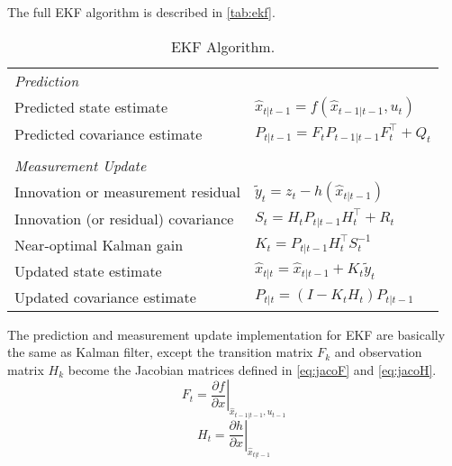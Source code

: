 The full \gls{EKF} algorithm is described in \autoref{tab:ekf}.
\begin{table}[h]
\begin{adjustbox}{max width=\textwidth}
  \centering
  \begin{tabular}{ll}
 \textit{Prediction} & \\
Predicted state estimate & $\hat{x}_{t|t-1} = f(\hat{x}_{t-1|t-1}, u_{t})$ \\
Predicted covariance estimate & $P_{t|t-1} =  {{F_{t}}} P_{t-1|t-1}{ {F_{t}^\top}} + Q_{t}$ \\
&\\
\textit{Measurement Update} & \\
Innovation or measurement residual & $\tilde{y}_{t} = z_{t} - h(\hat{x}_{t|t-1})$ \\
Innovation (or residual) covariance & $S_{t} = {{H_{t}}}P_{t|t-1}{{H_{t}^\top}} + R_{t}$ \\
Near-optimal Kalman gain & $K_{t} = P_{t|t-1}{{H_{t}^\top}}S_{t}^{-1}$ \\
Updated state estimate & $\hat{x}_{t|t} = \hat{x}_{t|t-1} + K_{t}\tilde{y}_{t}$ \\
Updated covariance estimate & $P_{t|t} = (I - K_{t} {{H_{t}}}) P_{t|t-1}$ \\
   
  \end{tabular}
  \end{adjustbox}
  \caption[Extended Kalman Filter Algorithm.]{\gls{EKF} Algorithm.}
  \label{tab:ekf}
\end{table}

The prediction and measurement update implementation for \gls{EKF} are basically the same as Kalman filter, except the transition matrix $F_{k}$ and observation matrix $H_{k}$ become the Jacobian matrices defined in \autoref{eq:jacoF} and \autoref{eq:jacoH}. \\
\begin{equation}
\label{eq:jacoF}
{{F_{t}}} = \left . \frac{\partial f}{\partial x } \right \vert _{\hat{x}_{t-1|t-1},u_{t-1}}
\end{equation}
\begin{equation}
\label{eq:jacoH}
{{H_{t}}} = \left . \frac{\partial h}{\partial x } \right \vert _{\hat{x}_{t|t-1}}
\end{equation}



